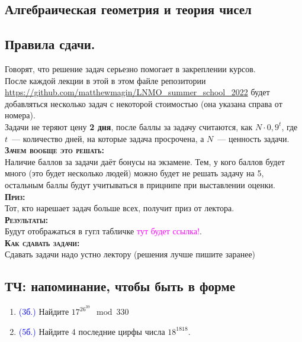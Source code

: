\documentclass[11pt]{article}
\begin{document}
\begin{center}
        \section*{Алгебраическая геометрия и теория чисел}
    \end{center}
    \tableofcontents
    \newpage
    \subsection*{Правила сдачи.}

    Говорят, что решение задач серьезно помогает в закреплении курсов. \\

    После каждой лекции в этой в этом файле  репозитории \url{https://github.com/matthewmagin/LNMO_summer_school_2022}
    будет добавляться несколько задач с некоторой стоимостью (она указана справа от номера).\\

    Задачи не теряют цену \textbf{2 дня}, после баллы за задачу считаются, как $N \cdot 0,9^{t}$, где
    $t$~--- количество дней, на которые задача просрочена, а $N$~--- ценность задачи. \\

    \textbf{\textsc{Зачем вообще это решать:}}\\
    Наличие баллов за задачи даёт бонусы на экзамене. Тем, у кого баллов будет много
    (это будет несколько людей) можно будет не решать задачу на 5, остальным баллы будут учитываться в прицнипе при выставлении оценки.\\

    \textbf{\textsc{Приз:}}\\
    Тот, кто нарешает задач больше всех, получит приз от лектора.\\

    \textbf{\textsc{Результаты:}}\\
    Будут отображаться в гугл табличке \textcolor{magenta}{тут будет ссылка!}. \\

    \textbf{\textsc{Как сдавать задачи:}}\\
    Сдавать задачи надо устно лектору (решения лучше пишите заранее)


    \newpage

    \subsection{ТЧ: напоминание, чтобы быть в форме}
    \begin{enumerate}[start=1,label={\bfseries \arabic*.}]
        \item \textcolor{blue}{(3б.)} Найдите $17^{26^{39}} \mod{330}$

        \item \textcolor{blue}{(5б.)} Найдите 4 последние цирфы числа $18^{1818}$.

    \end{enumerate}
\end{document}
